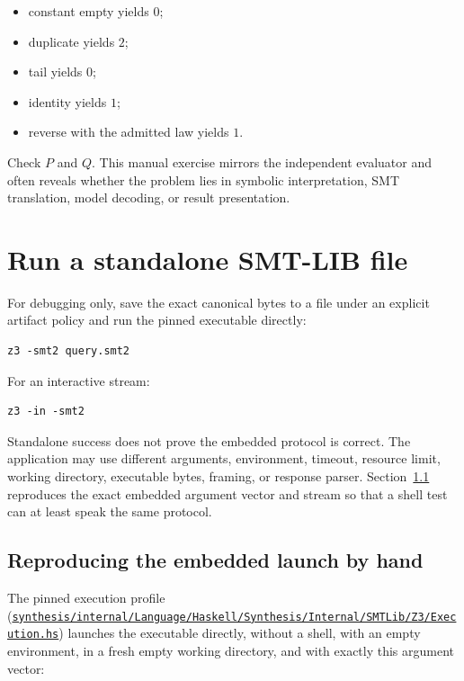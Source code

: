 \documentclass[10pt,letterpaper,oneside]{report}
\def\DjexPinnedCommit{7d65eba6f753727ae7b3d734fb4a7e00f1f44aa7}
\def\DjexBase{https://github.com/VladimirReshetnikov/Djex/blob/\DjexPinnedCommit/}
\newcommand{\dpath}[1]{\href{\DjexBase#1}{\nolinkurl{#1}}}
\begin{document}
\begin{itemize}
\item constant empty yields $0$;
\item duplicate yields $2$;
\item tail yields $0$;
\item identity yields $1$;
\item reverse with the admitted law yields $1$.
\end{itemize}

Check $P$ and $Q$. This manual exercise mirrors the independent evaluator and often reveals whether the problem lies in symbolic interpretation, SMT translation, model decoding, or result presentation.

\section{Run a standalone SMT-LIB file}

For debugging only, save the exact canonical bytes to a file under an explicit artifact policy and run the pinned executable directly:

\begin{lstlisting}[language=ShellX,caption={Standalone Z3 invocation for an SMT-LIB file.}]
z3 -smt2 query.smt2
\end{lstlisting}

For an interactive stream:

\begin{lstlisting}[language=ShellX]
z3 -in -smt2
\end{lstlisting}

Standalone success does not prove the embedded protocol is correct. The application may use different arguments, environment, timeout, resource limit, working directory, executable bytes, framing, or response parser. Section~\ref{sec:embedded-launch} reproduces the exact embedded argument vector and stream so that a shell test can at least speak the same protocol.

\subsection{Reproducing the embedded launch by hand}
\label{sec:embedded-launch}

The pinned execution profile (\dpath{synthesis/internal/Language/Haskell/Synthesis/Internal/SMTLib/Z3/Execution.hs}) launches the executable directly, without a shell, with an empty environment, in a fresh empty working directory, and with exactly this argument vector:
\end{document}
